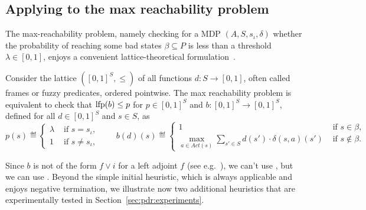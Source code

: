 \subsection{Applying {\ADPDR} to the max reachability problem}
The max-reachability problem, namely checking for a MDP $(A, S, s_\iota, \delta)$ whether the probability of reaching some bad states $\beta\subseteq P$ is less than a threshold $\lambda \in [0, 1]$, enjoys a convenient lattice-theoretical formulation~\cite{BK08}.

Consider the lattice $([0, 1]^S,\leq)$ of all functions $d\colon S\to [0,1]$, often called frames or fuzzy predicates, ordered pointwise. The max reachability problem is equivalent to check that $\text{lfp} (b) \leq p$ for $p\in[0,1]^S$ and $b \colon [0, 1]^S \to [0, 1]^S$, defined for all $d\in [0, 1]^S $ and $s\in S$, as
\begin{displaymath}
	p(s) \eqdef \begin{cases}
		\lambda & \text{ if } s=s_\iota,       \\
		1       & \text{ if }  s \neq s_\iota,
	\end{cases}
	\qquad
	b(d)(s) \eqdef \begin{cases}
		1                                                                                      & \text{ if } s \in \beta,     \\
		\displaystyle \max_{a \in \mathit{Act}(s)} \sum_{s'\in S} d(s') \cdot \delta(s, a)(s') & \text{ if } s \notin \beta .
	\end{cases}
\end{displaymath}

Since $b$ is not of the form $f\lor i$ for a left adjoint $f$ (see e.g.~\cite{KUKSH22}), we can't use {\APDR}, but we can use {\ADPDR}.
Beyond the simple initial heuristic, which is always applicable and enjoys negative termination, we illustrate now two additional heuristics that are experimentally tested in Section~\ref{sec:pdr:experiments}.

